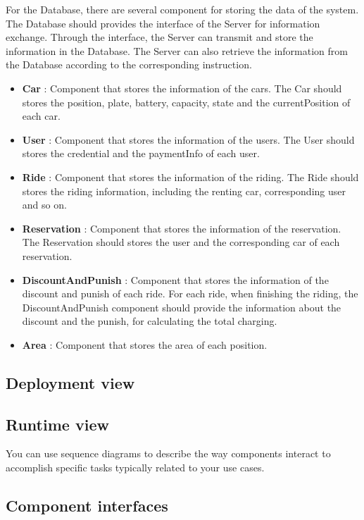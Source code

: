 \documentclass{article}
\begin{document}
	For the Database, there are several component for storing the data of the system. The Database should provides the interface of the Server for information exchange. Through the interface, the Server can transmit and  store the information in the Database. The Server can also retrieve the information from the Database according to the corresponding instruction.

	\begin{itemize}
		\item \textbf{Car} : Component that stores the information of the cars. The Car should stores the position, plate, battery, capacity, 	state and the currentPosition of each car.
		\item \textbf{User} : Component that stores the information of the users. The User should stores the credential and the paymentInfo of each user.
		\item \textbf{Ride} : Component that stores the information of the riding. The Ride should stores the riding information, including the renting car, corresponding user and so on.
		\item \textbf{Reservation} : Component that stores the information of the reservation. The Reservation should stores the user and the corresponding car of each reservation.
		\item \textbf{DiscountAndPunish} : Component that stores the information of the discount and punish of each ride. For each ride, when finishing the riding, the DiscountAndPunish component should provide the information about the discount and the punish, for calculating the total charging.
		\item \textbf{Area} : Component that stores the area of each position.
	\end{itemize}
	\newpage

	\subsection{Deployment view}
	\subsection{Runtime view}
	You can use sequence diagrams to describe the way components interact to accomplish specific tasks typically related to your use cases.
	\subsection{Component interfaces}
\end{document}
